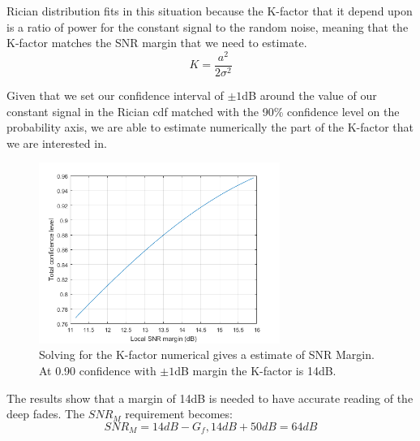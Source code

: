 \begin{where}
\end{where}

Rician distribution fits in this situation because the K-factor that it depend upon is a ratio of power for the constant signal to the random noise, meaning that the K-factor matches the \gls{SNR} margin that we need to estimate\cite[p.308]{Fading_Shadowing}.
\begin{equation}
K = \frac{a^2}{2\sigma^2}
\end{equation}

Given that we set our confidence interval of $\pm 1$dB around the value of our constant signal in the Rician cdf matched with the 90\% confidence level on the probability axis, we are able to estimate numerically the part of the K-factor that we are interested in.
\begin{figure}[H]
\centering
\includegraphics[width=0.70\textwidth]{figures/SNR_margin.png}
\caption{Solving for the K-factor numerical gives a estimate of SNR Margin. At 0.90 confidence with $\pm 1$dB margin  the K-factor is 14dB.}
\label{Rician_90}
\end{figure}

The results show that a margin of 14dB is needed to have accurate reading of the deep fades.
The $SNR_M$ requirement becomes:
\begin{equation}
SNR_M = 14dB - G_f , 14dB + 50dB = 64dB 
\end{equation}
\begin{where}
\end{where}


